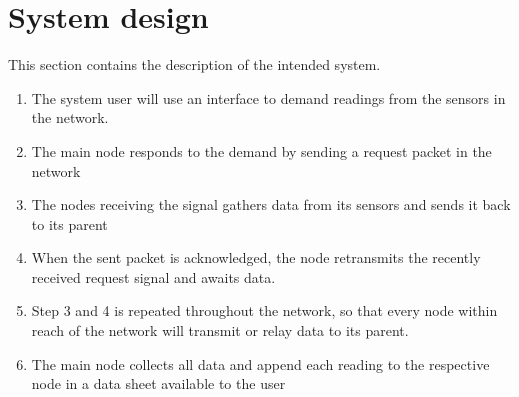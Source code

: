 \section{System design}
This section contains the description of the intended system. 

\begin{enumerate}
	\item The system user will use an interface to demand readings from the sensors in the network.
	\item The main node responds to the demand by sending a request packet in the network
	\item The nodes receiving the signal gathers data from its sensors and sends it back to its parent
	\item When the sent packet is acknowledged, the node retransmits the recently received request signal and awaits data.
	\item Step 3 and 4 is repeated throughout the network, so that every node within reach of the network will transmit or relay data to its parent.
	\item The main node collects all data and append each reading to the respective node in a data sheet available to the user
\end{enumerate}
